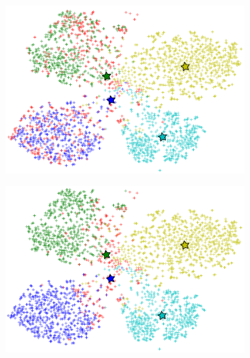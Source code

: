 \documentclass[10pt,twocolumn,letterpaper]{article}
\begin{document}
\begin{figure}[t]
\begin{subfigure}[b]{0.25\linewidth}
    \caption{}
    \label{fig:truth}
  \end{subfigure}
%
  \begin{subfigure}[b]{0.25\linewidth}
    \includegraphics[width=\linewidth]{knn}
    \caption{}
\label{fig:knn}
  \end{subfigure}
%
  \begin{subfigure}[b]{0.25\linewidth}
    \includegraphics[width=\linewidth]{kmeans}
    \caption{}
\label{fig:kmeans}
  \end{subfigure}

\end{figure}
\end{document}
